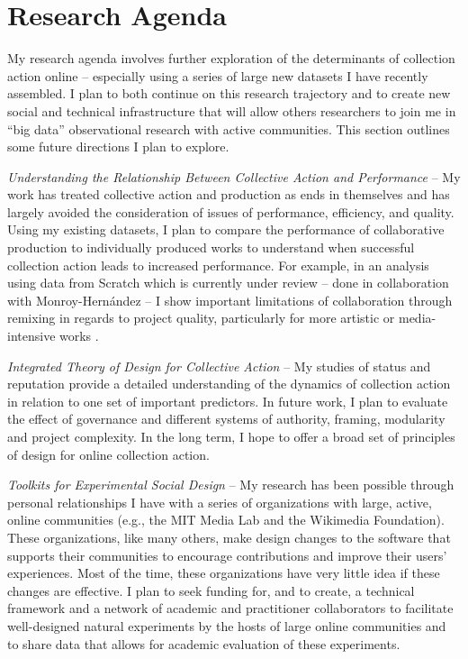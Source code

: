 \documentclass[10pt]{memoir}
\begin{document}

\section{Research Agenda}

My research agenda involves further exploration of the determinants of
collection action online -- especially using a series of large new
datasets I have recently assembled. I plan to both continue on this
research trajectory and to create new social and technical
infrastructure that will allow others researchers to join me in ``big
data'' observational research with active communities. This section
outlines some future directions I plan to explore.

\emph{Understanding the Relationship Between Collective Action and
  Performance} -- My work has treated collective action and production
as ends in themselves and has largely avoided the consideration of
issues of performance, efficiency, and quality. Using my existing
datasets, I plan to compare the performance of collaborative
production to individually produced works to understand when
successful collection action leads to increased performance. For
example, in an analysis using data from Scratch which is currently under
review -- done in collaboration with Monroy-Hernández -- I show
important limitations of collaboration through remixing in regards to
project quality, particularly for more artistic or media-intensive
works \cite{hill_cost_2012}.

\emph{Integrated Theory of Design for Collective Action} -- My studies
of status and reputation provide a detailed understanding of the dynamics of
collection action in relation to one set of important predictors. In future
work, I plan to evaluate the effect of governance and different
systems of authority, framing, modularity and project complexity. In
the long term, I hope to offer a broad set of principles of
design for online collection action.

\emph{Toolkits for Experimental Social Design} -- My research has been
possible through personal relationships I have with a series of
organizations with large, active, online communities (e.g., the MIT
Media Lab and the Wikimedia Foundation). These organizations, like
many others, make design changes to the software that supports their
communities to encourage contributions and improve their users'
experiences. Most of the time, these organizations have very little
idea if these changes are effective. I plan to seek funding for, and
to create, a technical framework and a network of academic and
practitioner collaborators to facilitate well-designed natural
experiments by the hosts of large online communities and to share data
that allows for academic evaluation of these experiments.
\end{document}

